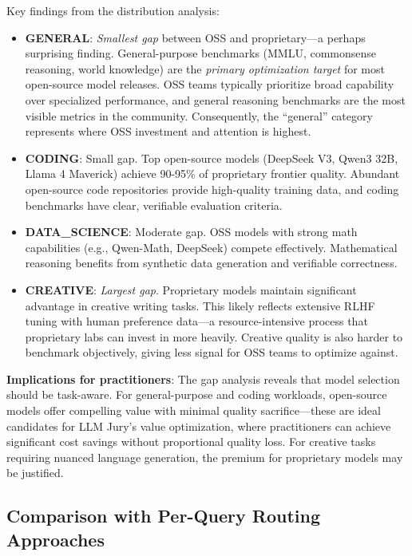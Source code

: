 \documentclass[11pt,a4paper]{article}
\begin{document}
Key findings from the distribution analysis:
\begin{itemize}
    \item \textbf{GENERAL}: \textit{Smallest gap} between OSS and proprietary---a perhaps surprising finding. General-purpose benchmarks (MMLU, commonsense reasoning, world knowledge) are the \textit{primary optimization target} for most open-source model releases. OSS teams typically prioritize broad capability over specialized performance, and general reasoning benchmarks are the most visible metrics in the community. Consequently, the ``general'' category represents where OSS investment and attention is highest.
    
    \item \textbf{CODING}: Small gap. Top open-source models (DeepSeek V3, Qwen3 32B, Llama 4 Maverick) achieve 90-95\% of proprietary frontier quality. Abundant open-source code repositories provide high-quality training data, and coding benchmarks have clear, verifiable evaluation criteria.
    
    \item \textbf{DATA\_SCIENCE}: Moderate gap. OSS models with strong math capabilities (e.g., Qwen-Math, DeepSeek) compete effectively. Mathematical reasoning benefits from synthetic data generation and verifiable correctness.
    
    \item \textbf{CREATIVE}: \textit{Largest gap}. Proprietary models maintain significant advantage in creative writing tasks. This likely reflects extensive RLHF tuning with human preference data---a resource-intensive process that proprietary labs can invest in more heavily. Creative quality is also harder to benchmark objectively, giving less signal for OSS teams to optimize against.
\end{itemize}

\textbf{Implications for practitioners}: The gap analysis reveals that model selection should be task-aware. For general-purpose and coding workloads, open-source models offer compelling value with minimal quality sacrifice---these are ideal candidates for LLM Jury's value optimization, where practitioners can achieve significant cost savings without proportional quality loss. For creative tasks requiring nuanced language generation, the premium for proprietary models may be justified.

\subsection{Comparison with Per-Query Routing Approaches}
\end{document}
